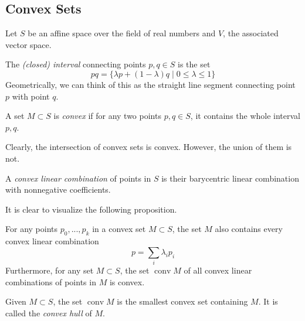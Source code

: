 \documentclass{article}
\DeclareMathOperator{\conv}{conv}
\begin{document}
  \subsection{Convex Sets}

    Let $S$ be an affine space over the field of real numbers and $V$, the associated vector space. 

    \begin{definition}
      The \textit{(closed) interval} connecting points $p, q \in S$ is the set
      \begin{equation}
        pq = \{\lambda p + (1-\lambda) q \;|\; 0 \leq \lambda \leq 1\}
      \end{equation}
      Geometrically, we can think of this as the straight line segment connecting point $p$ with point $q$. 
    \end{definition}

    \begin{definition}
      A set $M \subset S$ is \textit{convex} if for any two points $p, q \in S$, it contains the whole interval $p, q$. 
    \end{definition}

    Clearly, the intersection of convex sets is convex. However, the union of them is not. 

    \begin{definition}
      A \textit{convex linear combination} of points in $S$ is their barycentric linear combination with nonnegative coefficients. 
    \end{definition}

    It is clear to visualize the following proposition. 

    \begin{proposition}
      For any points $p_0, ..., p_k$ in a convex set $M \subset S$, the set $M$ also contains every convex linear combination 
      \begin{equation}
        p = \sum_i \lambda_i p_i
      \end{equation}
      Furthermore, for any set $M \subset S$, the set $\conv{M}$ of all convex linear combinations of points in $M$ is convex. 
    \end{proposition}

    \begin{definition}
      Given $M \subset S$, the set $\conv M$ is the smallest convex set containing $M$. It is called the \textit{convex hull} of $M$. 
    \end{definition}
\end{document}
